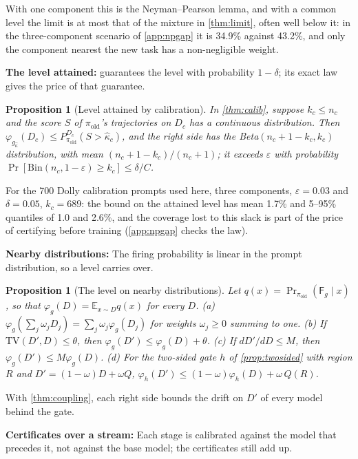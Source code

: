 \documentclass{article}
\theoremstyle{plain}
\newtheorem{proposition}[theorem]{Proposition}
\theoremstyle{definition}
\theoremstyle{remark}
\newcommand{\E}{\mathbb{E}}
\newcommand{\TV}{\mathrm{TV}}
\newcommand{\pold}{\pi_{\mathrm{old}}}
\newcommand{\Fire}{\mathsf{F}}
\begin{document}
With one component this is the Neyman--Pearson lemma, and with a common level the limit is at most that of the
mixture in \cref{thm:limit}, often well below it: in the three-component scenario of \cref{app:npgap} it is 34.9\%
against 43.2\%, and only the component nearest the new task has a non-negligible weight.

\textbf{The level attained:}  guarantees the level with probability $1-\delta$; its exact law gives
the price of that guarantee.

\begin{proposition}[Level attained by calibration]
\label{prop:size}
In \cref{thm:calib}, suppose $k_c\le n_c$ and the score $S$ of $\pold$'s trajectories on $D_c$ has a continuous distribution. Then
$\varphi_{g_{\hat\kappa}}(D_c)\le P^{D_c}_{\pold}(S>\hat\kappa_c)$, and the right side has the
Beta$(n_c+1-k_c,k_c)$ distribution, with mean $(n_c+1-k_c)/(n_c+1)$; it exceeds $\varepsilon$ with probability
$\Pr[\mathrm{Bin}(n_c,1-\varepsilon)\ge k_c]\le\delta/C$.
\end{proposition}

For the 700 Dolly calibration prompts used here, three components, $\varepsilon=0.03$ and $\delta=0.05$, $k_c=689$: the
bound on the attained level has mean 1.7\% and 5--95\% quantiles of 1.0 and 2.6\%, and the coverage lost to this slack is part of
the price of certifying before training (\cref{app:npgap} checks the law).

\textbf{Nearby distributions:} The firing probability is linear in the prompt distribution, so a level carries over.

\begin{proposition}[The level on nearby distributions]
\label{prop:transfer}
Let $q(x)=\Pr_{\pold}(\Fire_g\mid x)$, so that $\varphi_g(D)=\E_{x\sim D}q(x)$ for every $D$. (a)
$\varphi_g(\sum_j\omega_jD_j)=\sum_j\omega_j\varphi_g(D_j)$ for weights $\omega_j\ge0$ summing to one. (b) If
$\TV(D',D)\le\theta$, then $\varphi_g(D')\le\varphi_g(D)+\theta$. (c) If $dD'/dD\le M$, then $\varphi_g(D')\le M\varphi_g(D)$. (d) For the
two-sided gate $h$ of \cref{prop:twosided} with region $R$ and $D'=(1-\omega)D+\omega Q$,
$\varphi_h(D')\le(1-\omega)\varphi_h(D)+\omega\,Q(R)$.
\end{proposition}

With \cref{thm:coupling}, each right side bounds the drift on $D'$ of every model behind the gate.

\textbf{Certificates over a stream:} Each stage is calibrated against the model that precedes it, not against the base model; the
certificates still add up.
\end{document}
